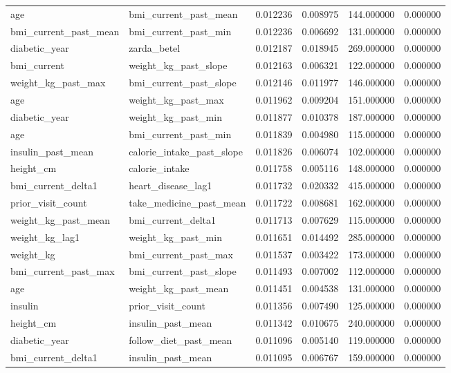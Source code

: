 \begin{longtable}{llrrrr}
age & bmi\_current\_past\_mean & 0.012236 & 0.008975 & 144.000000 & 0.000000 \\
bmi\_current\_past\_mean & bmi\_current\_past\_min & 0.012236 & 0.006692 & 131.000000 & 0.000000 \\
diabetic\_year & zarda\_betel & 0.012187 & 0.018945 & 269.000000 & 0.000000 \\
bmi\_current & weight\_kg\_past\_slope & 0.012163 & 0.006321 & 122.000000 & 0.000000 \\
weight\_kg\_past\_max & bmi\_current\_past\_slope & 0.012146 & 0.011977 & 146.000000 & 0.000000 \\
age & weight\_kg\_past\_max & 0.011962 & 0.009204 & 151.000000 & 0.000000 \\
diabetic\_year & weight\_kg\_past\_min & 0.011877 & 0.010378 & 187.000000 & 0.000000 \\
age & bmi\_current\_past\_min & 0.011839 & 0.004980 & 115.000000 & 0.000000 \\
insulin\_past\_mean & calorie\_intake\_past\_slope & 0.011826 & 0.006074 & 102.000000 & 0.000000 \\
height\_cm & calorie\_intake & 0.011758 & 0.005116 & 148.000000 & 0.000000 \\
bmi\_current\_delta1 & heart\_disease\_lag1 & 0.011732 & 0.020332 & 415.000000 & 0.000000 \\
prior\_visit\_count & take\_medicine\_past\_mean & 0.011722 & 0.008681 & 162.000000 & 0.000000 \\
weight\_kg\_past\_mean & bmi\_current\_delta1 & 0.011713 & 0.007629 & 115.000000 & 0.000000 \\
weight\_kg\_lag1 & weight\_kg\_past\_min & 0.011651 & 0.014492 & 285.000000 & 0.000000 \\
weight\_kg & bmi\_current\_past\_max & 0.011537 & 0.003422 & 173.000000 & 0.000000 \\
bmi\_current\_past\_max & bmi\_current\_past\_slope & 0.011493 & 0.007002 & 112.000000 & 0.000000 \\
age & weight\_kg\_past\_mean & 0.011451 & 0.004538 & 131.000000 & 0.000000 \\
insulin & prior\_visit\_count & 0.011356 & 0.007490 & 125.000000 & 0.000000 \\
height\_cm & insulin\_past\_mean & 0.011342 & 0.010675 & 240.000000 & 0.000000 \\
diabetic\_year & follow\_diet\_past\_mean & 0.011096 & 0.005140 & 119.000000 & 0.000000 \\
bmi\_current\_delta1 & insulin\_past\_mean & 0.011095 & 0.006767 & 159.000000 & 0.000000 \\

\end{longtable}
